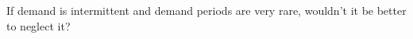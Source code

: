 \begin{exercise}
If demand is intermittent and demand periods are very rare, wouldn't it be better to neglect it?

\end{exercise}

